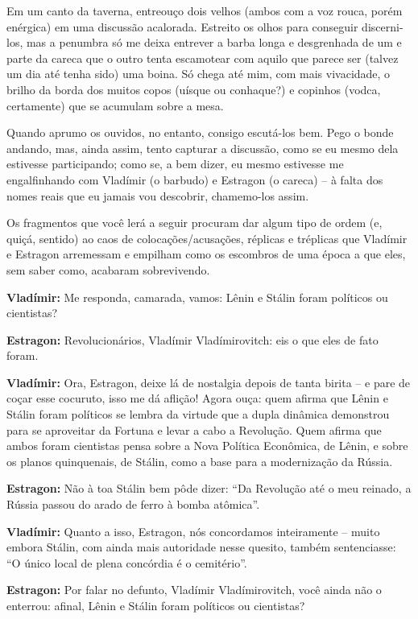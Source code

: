Em um canto da taverna, entreouço dois velhos (ambos com a voz rouca,
porém enérgica) em uma discussão acalorada. Estreito os olhos para
conseguir discerni-los, mas a penumbra só me deixa entrever a barba
longa e desgrenhada de um e parte da careca que o outro tenta escamotear
com aquilo que parece ser (talvez um dia até tenha sido) uma boina. Só
chega até mim, com mais vivacidade, o brilho da borda dos muitos copos
(uísque ou conhaque?) e copinhos (vodca, certamente) que se acumulam
sobre a mesa.

Quando aprumo os ouvidos, no entanto, consigo escutá-los bem. Pego o
bonde andando, mas, ainda assim, tento capturar a discussão, como se eu
mesmo dela estivesse participando; como se, a bem dizer, eu mesmo
estivesse me engalfinhando com Vladímir (o barbudo) e Estragon (o
careca) -- à falta dos nomes reais que eu jamais vou descobrir,
chamemo-los assim.

Os fragmentos que você lerá a seguir procuram dar algum tipo de ordem
(e, quiçá, sentido) ao caos de colocações/acusações, réplicas e
tréplicas que Vladímir e Estragon arremessam e empilham como os
escombros de uma época a que eles, sem saber como, acabaram
sobrevivendo.

\textbf{Vladímir:} Me responda, camarada, vamos: Lênin e Stálin foram
políticos ou cientistas?

\textbf{Estragon:} Revolucionários, Vladímir Vladímirovitch: eis o que
eles de fato foram.

\textbf{Vladímir:} Ora, Estragon, deixe lá de nostalgia depois de tanta
birita -- e pare de coçar esse cocuruto, isso me dá aflição! Agora ouça:
quem afirma que Lênin e Stálin foram políticos se lembra da virtude que
a dupla dinâmica demonstrou para se aproveitar da Fortuna e levar a cabo
a Revolução. Quem afirma que ambos foram cientistas pensa sobre a Nova
Política Econômica, de Lênin, e sobre os planos quinquenais, de Stálin,
como a base para a modernização da Rússia.

\textbf{Estragon:} Não à toa Stálin bem pôde dizer: ``Da Revolução até o
meu reinado, a Rússia passou do arado de ferro à bomba atômica''.

\textbf{Vladímir:} Quanto a isso, Estragon, nós concordamos inteiramente
-- muito embora Stálin, com ainda mais autoridade nesse quesito, também
sentenciasse: ``O único local de plena concórdia é o cemitério''.

\textbf{Estragon:} Por falar no defunto, Vladímir Vladímirovitch, você
ainda não o enterrou: afinal, Lênin e Stálin foram políticos ou
cientistas?

